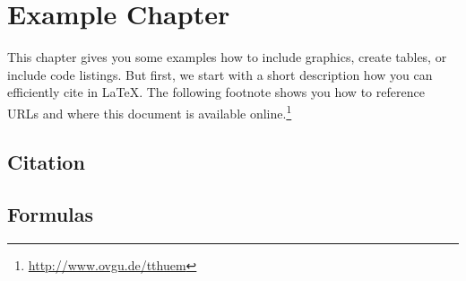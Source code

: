 \chapter{Example Chapter}
\label{example}

This chapter gives you some examples how to include graphics, create tables, or include code listings. But first, we start with a short description how you can efficiently cite in \LaTeX. The following footnote shows you how to reference URLs and where this document is available online.\footnote{\url{http://www.ovgu.de/tthuem}}

%
%

\section{Citation}




\section{Formulas}

